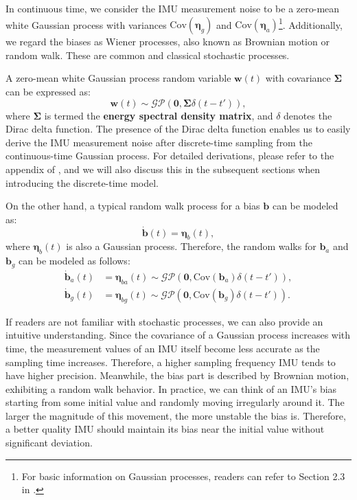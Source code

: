 In continuous time, we consider the IMU measurement noise to be a zero-mean white Gaussian process with variances $\mathrm{Cov}(\boldsymbol{\eta}_g)$ and $\mathrm{Cov}(\boldsymbol{\eta}_a)$\footnote{For basic information on Gaussian processes, readers can refer to Section 2.3 in \cite{Barfoot2016}.}. Additionally, we regard the biases as Wiener processes, also known as Brownian motion or random walk. These are common and classical stochastic processes.

A zero-mean white Gaussian process random variable $\mathbf{w}(t)$ with covariance $\boldsymbol{\Sigma}$ can be expressed as:
\begin{equation}\label{eq:white-gaussian-process}
	\mathbf{w}(t) \sim \mathcal{GP}(\mathbf{0}, \boldsymbol{\Sigma} \delta (t-t')),
\end{equation}
where $\boldsymbol{\Sigma}$ is termed the \textbf{energy spectral density matrix}, and $\delta$ denotes the Dirac delta function. The presence of the Dirac delta function enables us to easily derive the IMU measurement noise after discrete-time sampling from the continuous-time Gaussian process. For detailed derivations, please refer to the appendix of \cite{Crassidis2006}, and we will also discuss this in the subsequent sections when introducing the discrete-time model.

On the other hand, a typical random walk process for a bias $\mathbf{b}$ can be modeled as:
\begin{equation}\label{eq:random-walk}
	\dot{\mathbf{b}}(t) = \boldsymbol{\eta}_b (t),
\end{equation}
where $\boldsymbol{\eta}_b (t)$ is also a Gaussian process. Therefore, the random walks for $\mathbf{b}_a$ and $\mathbf{b}_g$ can be modeled as follows:
\begin{subequations}\label{eq:bias-random-walk}
	\begin{align}
		\dot{\mathbf{b}}_a (t) &= \boldsymbol{\eta}_{ba}(t) \sim \mathcal{GP}(\mathbf{0}, 
		\mathrm{Cov}(\boldsymbol{b}_a) \delta (t-t')), \\
		\dot{\mathbf{b}}_g (t) &= \boldsymbol{\eta}_{bg}(t) \sim \mathcal{GP}(\mathbf{0}, 
		\mathrm{Cov}(\boldsymbol{b}_g) \delta (t-t')).
	\end{align}
\end{subequations}

If readers are not familiar with stochastic processes, we can also provide an intuitive understanding. Since the covariance of a Gaussian process increases with time, the measurement values of an IMU itself become less accurate as the sampling time increases. Therefore, a higher sampling frequency IMU tends to have higher precision. Meanwhile, the bias part is described by Brownian motion, exhibiting a random walk behavior. In practice, we can think of an IMU's bias starting from some initial value and randomly moving irregularly around it. The larger the magnitude of this movement, the more unstable the bias is. Therefore, a better quality IMU should maintain its bias near the initial value without significant deviation.


